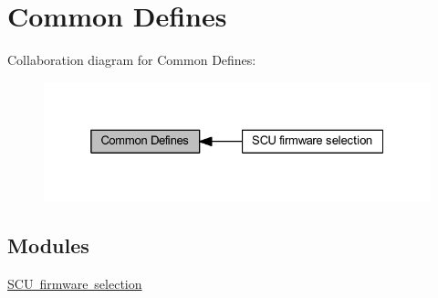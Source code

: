 \hypertarget{group___common__defines__group}{}\section{Common Defines}
\label{group___common__defines__group}
Collaboration diagram for Common Defines\+:\nopagebreak
\begin{figure}[H]
\begin{center}
\leavevmode
\includegraphics[width=325pt]{group___common__defines__group}
\end{center}
\end{figure}
\subsection*{Modules}
\begin{DoxyCompactItemize}
\item 
\mbox{\hyperlink{group___s_c_u__firmware__selection}{S\+C\+U firmware selection}}
\end{DoxyCompactItemize}

